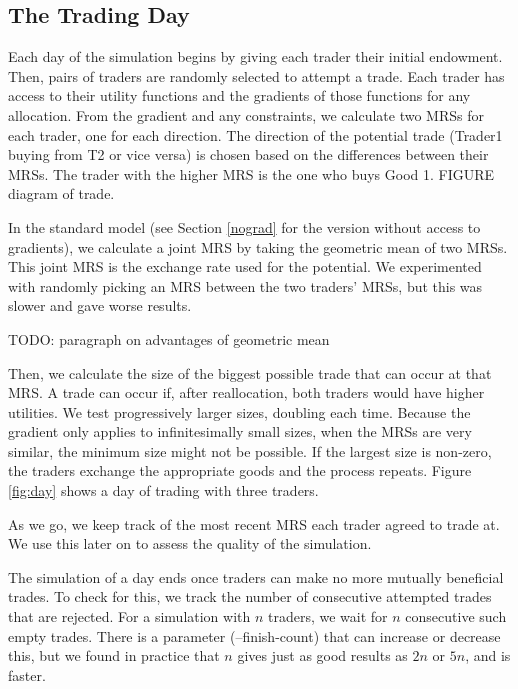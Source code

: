\documentclass[12pt,a4paper,titlepage]{article}
\begin{document}
\subsection{The Trading Day}

Each day of the simulation begins by giving each trader their initial endowment.
Then, pairs of traders are randomly selected to attempt a trade.
Each trader has access to their utility functions and the gradients of those functions for any allocation.
From the gradient and any constraints, we calculate two MRSs for each trader, one for each direction.
The direction of the potential trade (Trader1 buying from T2 or vice versa) is chosen based on the differences between their MRSs.
The trader with the higher MRS is the one who buys Good 1.
FIGURE diagram of trade.

In the standard model (see Section \ref{nograd} for the version without access to gradients), we calculate a joint MRS by taking the geometric mean of two MRSs.
This joint MRS is the exchange rate used for the potential.
We experimented with randomly picking an MRS between the two traders' MRSs, but this was slower and gave worse results.

TODO: paragraph on advantages of geometric mean

Then, we calculate the size of the biggest possible trade that can occur at that MRS.
A trade can occur if, after reallocation, both traders would have higher utilities.
We test progressively larger sizes, doubling each time.
Because the gradient only applies to infinitesimally small sizes, when the MRSs are very similar, the minimum size might not be possible.
If the largest size is non-zero, the traders exchange the appropriate goods and the process repeats.
Figure \ref{fig:day} shows a day of trading with three traders.

As we go, we keep track of the most recent MRS each trader agreed to trade at.
We use this later on to assess the quality of the simulation.

The simulation of a day ends once traders can make no more mutually beneficial trades.
To check for this, we track the number of consecutive attempted trades that are rejected. 
For a simulation with $n$ traders, we wait for $n$ consecutive such empty trades.
There is a parameter (--finish-count) that can increase or decrease this, but we found in practice that $n$ gives just as good results as $2n$ or $5n$, and is faster.
\end{document}
